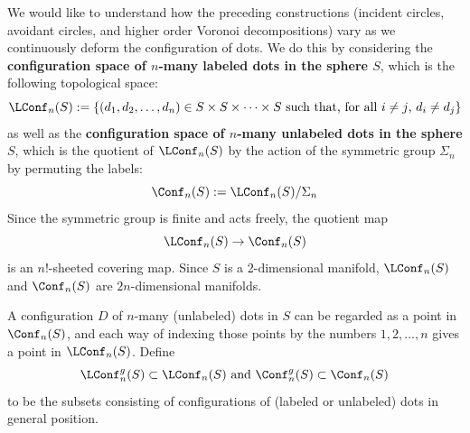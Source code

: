 \documentclass[11pt,oneside]{amsart}
\theoremstyle{definition}
\theoremstyle{remark}
\numberwithin{equation}{section}
\begin{document}
We would like to understand how the preceding constructions (incident circles, avoidant circles, and higher order Voronoi decompositions) vary as we continuously deform the configuration of dots.
%
We do this by considering the \textbf{configuration space of $n$-many labeled dots in the sphere $S$}, which is the following topological space:
\[
\LConf_n(S) := \{ (d_1,d_2,\dotsc,d_n) \in S\times S\times \dotsb \times S \text{ such that, for all $i\neq j$, $d_i\neq d_j$}\}
\]
as well as the \textbf{configuration space of $n$-many unlabeled dots in the sphere $S$}, which is the quotient of $\LConf_n(S)$ by the action of the symmetric group $\Sigma_n$ by permuting the labels:
\[
\Conf_n(S) := \LConf_n(S) / \Sigma_n
\]
Since the symmetric group is finite and acts freely, the quotient map 
\[
\LConf_n(S)\rightarrow \Conf_n(S)
\]
is an $n!$-sheeted covering map. Since $S$ is a 2-dimensional manifold, $\LConf_n(S)$ and $\Conf_n(S)$ are $2n$-dimensional manifolds.
%
%

A configuration $D$ of $n$-many (unlabeled) dots in $S$ can be regarded as a point in $\Conf_n(S)$, and each way of indexing those points by the numbers $1,2,\dotsc,n$ gives a point in $\LConf_n(S)$.
Define
\[
\LConf_n^g(S)
\subset
\LConf_n(S)
\text{ and }
\Conf_n^g(S)
\subset
\Conf_n(S)
\]
to be the subsets consisting of configurations of (labeled or unlabeled) dots in general position. 
\end{document}
